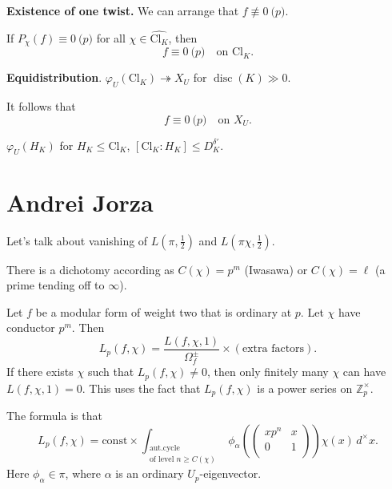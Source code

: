 \documentclass[reqno]{amsart} 
\begin{document}
\textbf{Existence of one twist.}  We can arrange that $f \not \equiv 0 \pod{p}$.

If $P_\chi(f) \equiv 0 \pod{p}$ for all $\chi \in \widehat{\mathrm{Cl}_K}$, then
\begin{equation*}
  f \equiv 0 \pod{p} \quad \text{on } \mathrm{Cl}_K.
\end{equation*}

\textbf{Equidistribution}. $\varphi_U(\mathrm{Cl}_K) \twoheadrightarrow X_U$ for $\operatorname{disc}(K) \gg 0$.

It follows that
\begin{equation*}
  f \equiv 0 \pod{p}\quad \text{on } X_U.
\end{equation*}

$\varphi_U(H_K)$ for $H_K \leq \mathrm{Cl}_K$, $[\mathrm{Cl}_K : H_K] \leq D_K^{\delta '}$.

\section{Andrei Jorza}
Let's talk about vanishing of $L(\pi, \tfrac{1}{2})$ and $L(\pi \chi, \tfrac{1}{2})$.

There is a dichotomy according as $C(\chi) = p^m$ (Iwasawa) or $C(\chi) = \ell$ (a prime tending off to $\infty$).

Let $f$ be a modular form of weight two that is ordinary at $p$.  Let $\chi$ have conductor $p^m$.  Then
\begin{equation*}
  L_p(f, \chi) = \frac{L(f, \chi, 1)}{\Omega_f^{\pm}}
  \times(\text{extra factors}).
\end{equation*}
If there exists $\chi$ such that $L_p(f, \chi) \neq 0$, then only finitely many $\chi$ can have $L(f, \chi, 1) = 0$.  This uses the fact that $L_p(f, \chi)$ is a power series on $\mathbb{Z}_p^\times$.

The formula is that
\begin{equation*}
  L_p(f, \chi) = \mathrm{const} \times \int_{
    \substack{
      \mathrm{aut. cycle}  \\
      \text{of level } n \geq C(\chi)
    }
  } \phi_\alpha \left(
    \begin{pmatrix}
      x p^n  & x \\
      0 & 1 \\
    \end{pmatrix} \right) \chi(x) \,d^\times x.
\end{equation*}
Here $\phi_\alpha \in \pi$, where $\alpha$ is an ordinary $U_p$-eigenvector.
\end{document}
